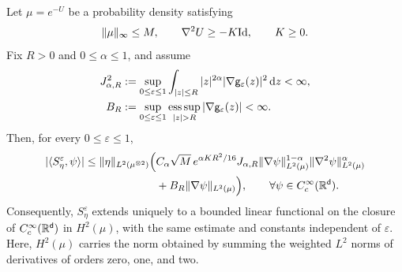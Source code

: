 \documentclass[11pt,reqno]{amsart}
\numberwithin{equation}{section}
\theoremstyle{plain}
\theoremstyle{remark}
\DeclarePairedDelimiter{\norm}{\lVert}{\rVert}
\renewcommand{\d}{\mathsf{d}}\newcommand{\s}{\mathsf{s}}
\newcommand{\Id}{\mathrm{Id}}
\begin{document}
\begin{lemma}\label{lem:weighted-commutator}
Let $\mu=e^{-U}$ be a probability density satisfying
\begin{equation}\label{eq:weighted-density-hypotheses}
 \norm\mu_\infty\le M,\qquad \nabla^2U\ge-K\Id,\qquad K\ge0.
\end{equation}
Fix $R>0$ and $0\le\alpha\le1$, and assume
\begin{align}
 J_{\alpha,R}^2&:=\sup_{0\le\varepsilon\le1}\int_{|z|\le R}|z|^{2\alpha}
                              |\nabla\g_\varepsilon(z)|^2\dd z<\infty,
 \label{eq:local-force-norms}\\
 B_R&:=\sup_{0\le\varepsilon\le1}\mathop{\mathrm{ess\,sup}}_{|z|>R}
                                     |\nabla\g_\varepsilon(z)|<\infty.
 \label{eq:far-force-norm}
\end{align}
Then, for every $0\le\varepsilon\le1$,
\begin{align}
 |\langle S_\eta^\varepsilon,\psi\rangle|
 \le\norm\eta_{L^2(\mu^{\otimes2})}\Big(&C_\alpha\sqrt M\,e^{\alpha KR^2/16}J_{\alpha,R}
       \norm{\nabla\psi}_{L^2(\mu)}^{1-\alpha}
       \norm{\nabla^2\psi}_{L^2(\mu)}^\alpha\notag\\
       &+B_R\norm{\nabla\psi}_{L^2(\mu)}\Big),
       \qquad \forall\psi\in C_c^\infty(\R^\d).
 \label{eq:weighted-commutator}
\end{align}
Consequently, $S_\eta^\varepsilon$ extends uniquely to a bounded linear functional on the closure of $C_c^\infty(\R^\d)$ in $H^2(\mu)$, with the same estimate and constants independent of $\varepsilon$. Here, $H^2(\mu)$ carries the norm obtained by summing the weighted $L^2$ norms of derivatives of orders zero, one, and two.
\end{lemma}
\end{document}
